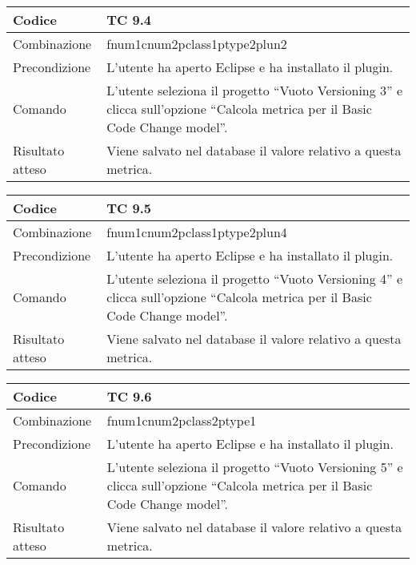 \begin{table}[ht]
\begin{tabular}{|p{3cm}|p{9cm}|}
\hline
\cellcolor{lightgray}Codice				& TC 9.4								\\
\hline
\cellcolor{lightgray}Combinazione		& fnum1cnum2pclass1ptype2plun2									\\
\hline
\cellcolor{lightgray}Precondizione		& L'utente ha aperto Eclipse e ha installato il plugin.		\\
\hline
\cellcolor{lightgray}Comando			& L'utente seleziona il progetto ``Vuoto Versioning 3''  e clicca sull'opzione ``Calcola metrica per il Basic Code Change model''.	\\
\hline
\cellcolor{lightgray}Risultato atteso	& Viene salvato nel database il valore relativo a questa metrica.\\
\hline
\end{tabular}
\end{table}


\begin{table}[ht]
\begin{tabular}{|p{3cm}|p{9cm}|}
\hline
\cellcolor{lightgray}Codice				& TC 9.5								\\
\hline
\cellcolor{lightgray}Combinazione		& fnum1cnum2pclass1ptype2plun4									\\
\hline
\cellcolor{lightgray}Precondizione		& L'utente ha aperto Eclipse e ha installato il plugin.		\\
\hline
\cellcolor{lightgray}Comando			& L'utente seleziona il progetto ``Vuoto Versioning 4''  e clicca sull'opzione ``Calcola metrica per il Basic Code Change model''.	\\
\hline
\cellcolor{lightgray}Risultato atteso	& Viene salvato nel database il valore relativo a questa metrica.\\
\hline
\end{tabular}
\end{table}


\begin{table}[ht]
\begin{tabular}{|p{3cm}|p{9cm}|}
\hline
\cellcolor{lightgray}Codice				& TC 9.6								\\
\hline
\cellcolor{lightgray}Combinazione		& fnum1cnum2pclass2ptype1									\\
\hline
\cellcolor{lightgray}Precondizione		& L'utente ha aperto Eclipse e ha installato il plugin.		\\
\hline
\cellcolor{lightgray}Comando			& L'utente seleziona il progetto ``Vuoto Versioning 5''  e clicca sull'opzione ``Calcola metrica per il Basic Code Change model''.	\\
\hline
\cellcolor{lightgray}Risultato atteso	& Viene salvato nel database il valore relativo a questa metrica.\\
\hline
\end{tabular}
\end{table}


